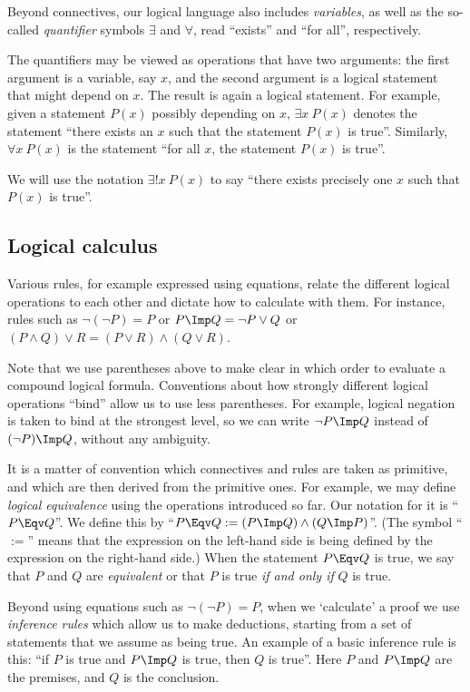 Beyond connectives, our logical language also includes \emph{variables}, as well as the so-called \emph{quantifier} symbols $\exists$ and $\forall$, read ``exists'' and ``for all'', respectively. 

The quantifiers may be viewed as operations that have two arguments: the first argument is a variable, say $x$, and the second argument is a logical statement that might depend on $x$. The result is again a logical statement. For example, given a statement $P(x)$ possibly depending on $x$, $\exists x \ P(x)$ denotes the statement ``there exists an $x$ such that the statement $P(x)$ is true''. Similarly, $\forall x \ P(x)$ is the statement ``for all $x$, the statement $P(x)$ is true''. 

We will use the notation $\exists! x \ P(x)$ to say ``there exists precisely one $x$ such that $P(x)$ is true''. 


\subsection{Logical calculus}

Various rules, for example expressed using equations, relate the different logical operations to each other and dictate how to calculate with them. For instance, rules such as $\lnot (\lnot P) = P$ or $P \Imp Q = \lnot P \vee Q$ or $(P \wedge Q) \vee R = (P \vee R) \wedge (Q \vee R)$. 

Note that we use parentheses above to make clear in which order to evaluate a compound logical formula. Conventions about how strongly different logical operations ``bind'' allow us to use less parentheses. For example, logical negation is taken to bind at the strongest level, so we can write $\lnot P \Imp Q$ instead of $(\lnot P) \Imp Q$, without any ambiguity. 

It is a matter of convention which connectives and rules are taken as primitive, and which are then derived from the primitive ones. For example, we may define \emph{logical equivalence} using the operations introduced so far. Our notation for it is ``$P \Eqv Q$''. We define this by ``$P \Eqv Q := (P \Imp Q) \wedge (Q \Imp P)$''. (The symbol ``$:=$'' means that the expression on the left-hand side is being defined by the expression on the right-hand side.) When the statement $P \Eqv Q$ is true, we say that $P$ and $Q$ are \emph{equivalent} or that $P$ is true \emph{if and only if} $Q$ is true. 

Beyond using equations such as $\lnot (\lnot P) = P$, when we `calculate' a proof we use \emph{inference rules} which allow us to make deductions, starting from a set of statements that we assume as being true. An example of a basic inference rule is this: ``if $P$ is true and $P \Imp Q$ is true, then $Q$ is true''. Here $P$ and $P \Imp Q$ are the premises, and $Q$ is the conclusion. 

